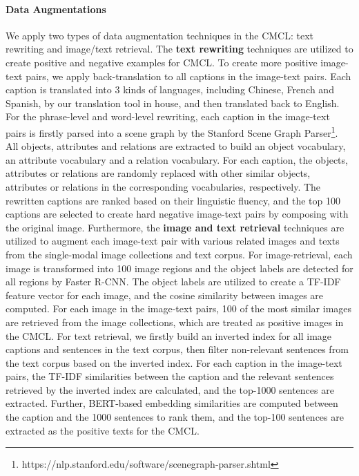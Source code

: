 \documentclass[11pt,a4paper]{article}
\begin{document}
\paragraph{Data Augmentations} We apply two types of data augmentation techniques in the CMCL: text rewriting and image/text retrieval. The \textbf{text rewriting} techniques are utilized to create positive and negative examples for CMCL. To create more positive image-text pairs, we apply back-translation to all captions in the image-text pairs. Each caption is translated into 3 kinds of languages, including Chinese, French and Spanish, by our translation tool in house, and then translated back to English. For the phrase-level and word-level rewriting, each caption in the image-text pairs is firstly parsed into a scene graph by the Stanford Scene Graph Parser\footnote{https://nlp.stanford.edu/software/scenegraph-parser.shtml}. All objects, attributes and relations are extracted to build an object vocabulary, an attribute vocabulary and a relation vocabulary. For each caption, the objects, attributes or relations are randomly replaced with other similar objects, attributes or relations in the corresponding vocabularies, respectively. The rewritten captions are ranked based on their linguistic fluency, and the top 100 captions are selected to create hard negative image-text pairs by composing with the original image.
Furthermore, the \textbf{image and text retrieval} techniques are utilized to augment each image-text pair with various related images and texts from the single-modal image collections and text corpus.
For image-retrieval, each image is transformed into 100 image regions and the object labels are detected for all regions by Faster R-CNN.
The object labels are utilized to create a TF-IDF feature vector for each image, and the cosine similarity between images are computed.
For each image in the image-text pairs, 100 of the most similar images are retrieved from the image collections, which are treated as positive images in the CMCL.
For text retrieval, we firstly build an inverted index for all image captions and sentences in the text corpus, then filter non-relevant sentences from the text corpus based on the inverted index.
For each caption in the image-text pairs, the TF-IDF similarities between the caption and the relevant sentences retrieved by the inverted index are calculated, and the top-1000 sentences are extracted.
Further, BERT-based embedding similarities are computed between the caption and the 1000 sentences to rank them, and the top-100 sentences are extracted as the positive texts for the CMCL.
\end{document}
